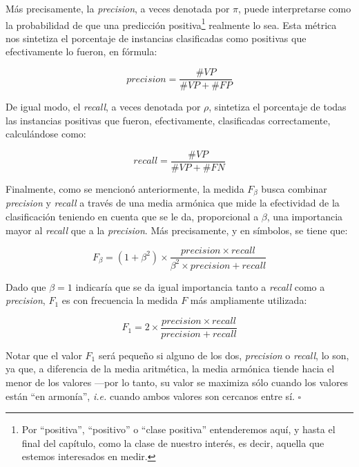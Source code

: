Más precisamente, la \emph{precision}, a veces denotada por $\pi$\cite{sebastiani2002machine}, puede interpretarse como la probabilidad de que una predicción positiva\footnote{Por ``positiva'', ``positivo'' o ``clase positiva'' entenderemos aquí, y hasta el final del capítulo, como la clase de nuestro interés, es decir, aquella que estemos interesados en medir.} realmente lo sea. Esta métrica nos sintetiza el porcentaje de instancias clasificadas como positivas que efectivamente lo fueron, en fórmula:

\begin{equation}
precision = \frac{\#VP}{\#VP + \#FP}
\label{eq:precision}
\end{equation}


De igual modo, el \emph{recall}, a veces denotada por $\rho$\cite{sebastiani2002machine}, sintetiza el porcentaje de todas las instancias positivas que fueron, efectivamente, clasificadas correctamente, calculándose como:

\begin{equation}
recall = \frac{\#VP}{\#VP + \#FN}
\label{eq:recall}
\end{equation}

Finalmente, como se mencionó anteriormente, la medida $F_\beta$ busca combinar \emph{precision} y \emph{recall} a través de una media armónica que mide la efectividad de la clasificación teniendo en cuenta que se le da, proporcional a $\beta$, una importancia  mayor al \emph{recall} que a la \emph{precision}. Más precisamente, y en símbolos, se tiene que:

\begin{equation}
F_\beta = (1 + \beta^2) \times \frac{precision\times recall}{\beta^2 \times precision + recall}
\label{eq:fbeta}
\end{equation}


Dado que $\beta=1$ indicaría que se da igual importancia tanto a \emph{recall} como a \emph{precision}, $F_1$ es con frecuencia la medida $F$ más ampliamente utilizada:

\begin{equation}
F_1 = 2 \times \frac{precision\times recall}{precision + recall}
\label{eq:f1}
\end{equation}

Notar que el valor $F_1$ será pequeño si alguno de los dos, \emph{precision} o \emph{recall}, lo son, ya que, a diferencia de la media aritmética, la media armónica tiende hacia el menor de los valores ---por lo tanto, su valor se maximiza sólo cuando los valores están ``en armonía'', \emph{i.e.} cuando ambos valores son cercanos entre sí.
\hfill$\square$
